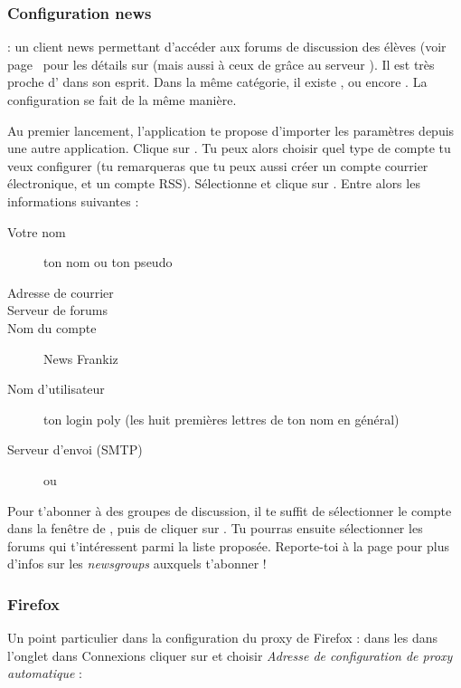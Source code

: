 \subsubsection{Configuration news}

  : un client news permettant d'accéder aux forums de discussion des élèves (voir page~\pageref{newsgroups} pour les détails sur  (mais aussi à ceux de  grâce au serveur ). Il est très proche d' dans son esprit. Dans la même catégorie, il existe ,  ou encore . La configuration se fait de la même manière.

Au premier lancement, l'application te propose d'importer les paramètres depuis une autre application. Clique sur . Tu peux alors choisir quel type de compte tu veux configurer (tu remarqueras que tu peux aussi créer un compte courrier électronique, et un compte RSS). Sélectionne  et clique sur . Entre alors les informations suivantes :

\begin{description}
  \item[Votre nom] ton nom ou ton pseudo
  \item[Adresse de courrier] 
  \item[Serveur de forums] 
  \item[Nom du compte] News Frankiz
  \item[Nom d'utilisateur] ton login poly (les huit premières lettres de ton nom en général)
  \item[Serveur d'envoi (SMTP)]  ou 
\end{description}


Pour t'abonner à des groupes de discussion, il te suffit de sélectionner le compte  dans la fenêtre  de , puis de cliquer sur . Tu pourras ensuite sélectionner les forums qui t'intéressent parmi la liste proposée. Reporte-toi à la page \pageref{newsgroups} pour plus d'infos sur les \emph{newsgroups} auxquels t'abonner !

\subsubsection{Firefox}
Un point particulier dans la configuration du proxy de Firefox : dans les  dans l'onglet  dans Connexions cliquer sur  et choisir \emph{Adresse de configuration de proxy automatique} : 

